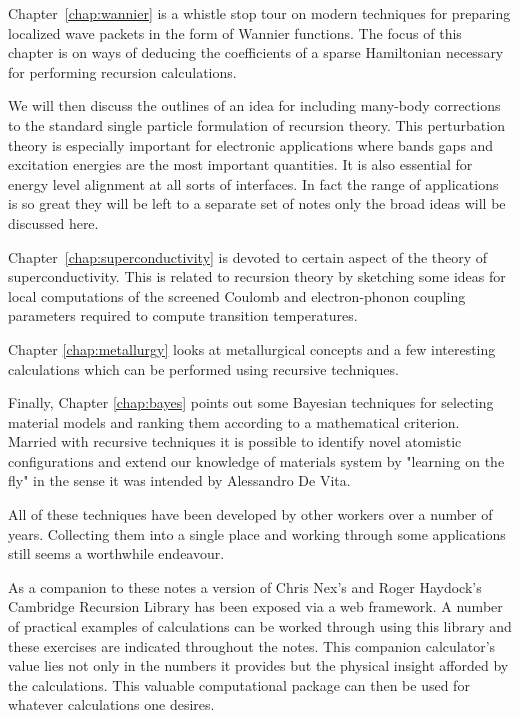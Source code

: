 Chapter~\ref{chap:wannier} is a whistle stop tour 
on modern techniques for preparing localized wave packets in the 
form of Wannier functions. The focus of this chapter is on 
ways of deducing the coefficients of a sparse Hamiltonian
necessary for performing recursion calculations.

We will then discuss the outlines of an idea for 
including many-body corrections to the standard 
single particle formulation of recursion theory. 
This perturbation theory is especially important for electronic 
applications where bands gaps and excitation energies 
are the most important quantities. It is also essential for
energy level alignment at all sorts of interfaces. In fact the range
of applications is so great they will be left to a separate set of notes
only the broad ideas will be discussed here.

Chapter~\ref{chap:superconductivity} is devoted to
certain aspect of the theory of superconductivity. 
This is related to recursion theory by sketching some ideas for 
local computations of the screened Coulomb and electron-phonon
coupling parameters required to compute transition temperatures.

Chapter \ref{chap:metallurgy} looks at metallurgical concepts 
and a few interesting calculations which can be performed 
using recursive techniques. 

Finally, Chapter \ref{chap:bayes} points out some Bayesian techniques 
for selecting material models and ranking them according 
to a mathematical criterion. Married with recursive techniques
it is possible to identify novel atomistic configurations
and extend our knowledge of materials system by "learning on the fly" 
in the sense it was intended by Alessandro De Vita.

All of these techniques have been developed by other workers 
over a number of years. Collecting them into a single place 
and working through some applications still seems a worthwhile 
endeavour. 

As a companion to these notes a version of Chris Nex's and Roger Haydock's Cambridge Recursion Library
has been exposed via a web framework. A number of practical examples of calculations can
be worked through using this library and these exercises are indicated throughout the notes. 
This companion calculator's value lies not only
in the numbers it provides but the physical insight afforded by the calculations.
This valuable computational package can then be used for whatever calculations one desires.

